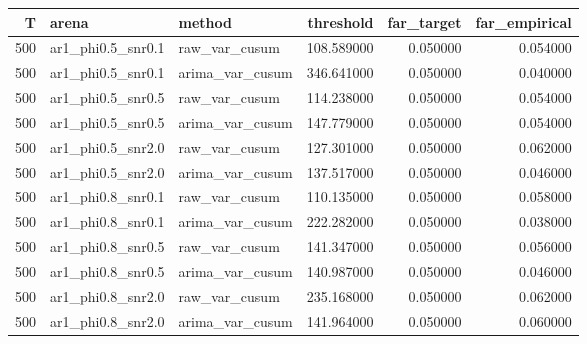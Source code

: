 \begin{tabular}{rllrrr}
\toprule
T & arena & method & threshold & far_target & far_empirical \\
\midrule
500 & ar1_phi0.5_snr0.1 & raw_var_cusum & 108.589000 & 0.050000 & 0.054000 \\
500 & ar1_phi0.5_snr0.1 & arima_var_cusum & 346.641000 & 0.050000 & 0.040000 \\
500 & ar1_phi0.5_snr0.5 & raw_var_cusum & 114.238000 & 0.050000 & 0.054000 \\
500 & ar1_phi0.5_snr0.5 & arima_var_cusum & 147.779000 & 0.050000 & 0.054000 \\
500 & ar1_phi0.5_snr2.0 & raw_var_cusum & 127.301000 & 0.050000 & 0.062000 \\
500 & ar1_phi0.5_snr2.0 & arima_var_cusum & 137.517000 & 0.050000 & 0.046000 \\
500 & ar1_phi0.8_snr0.1 & raw_var_cusum & 110.135000 & 0.050000 & 0.058000 \\
500 & ar1_phi0.8_snr0.1 & arima_var_cusum & 222.282000 & 0.050000 & 0.038000 \\
500 & ar1_phi0.8_snr0.5 & raw_var_cusum & 141.347000 & 0.050000 & 0.056000 \\
500 & ar1_phi0.8_snr0.5 & arima_var_cusum & 140.987000 & 0.050000 & 0.046000 \\
500 & ar1_phi0.8_snr2.0 & raw_var_cusum & 235.168000 & 0.050000 & 0.062000 \\
500 & ar1_phi0.8_snr2.0 & arima_var_cusum & 141.964000 & 0.050000 & 0.060000 \\
\bottomrule
\end{tabular}
